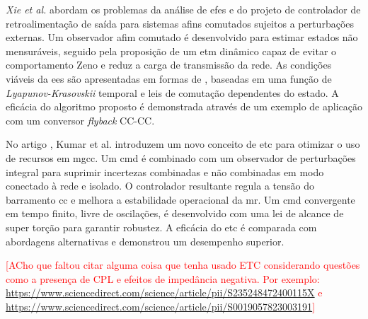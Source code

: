 \textit{Xie et al.} \cite{Xie2023} abordam os problemas da análise de \acrshort{efes} e do projeto de controlador de retroalimentação de saída para sistemas afins comutados sujeitos a perturbações externas. Um observador afim comutado é desenvolvido para estimar estados não mensuráveis, seguido pela proposição de um \acrshort{etm} dinâmico capaz de evitar o comportamento Zeno e reduz a carga de transmissão da rede. As condições viáveis da \acrshort{ees} são apresentadas em formas de , baseadas em uma função de \textit{Lyapunov-Krasovskii} temporal e leis de comutação dependentes do estado. A eficácia do algoritmo proposto é demonstrada através de um exemplo de aplicação com um conversor \textit{flyback} CC-CC.

No artigo \cite{Kumar2020}, Kumar et al. introduzem um novo conceito de \acrshort{etc} para otimizar o uso de recursos em \acrshort{mgcc}. Um \acrfull{cmd} é combinado com um observador de perturbações integral para suprimir incertezas combinadas e não combinadas em modo conectado à rede e isolado. O controlador resultante regula a tensão do barramento \acrshort{cc} e melhora a estabilidade operacional da \acrshort{mr}. Um \acrshort{cmd} convergente em tempo finito, livre de oscilações, é desenvolvido com uma lei de alcance de super torção para garantir robustez. A eficácia do \acrshort{etc} é comparada com abordagens alternativas e demonstrou um desempenho superior.

\textcolor{red}{[ACho que faltou citar alguma coisa que tenha usado ETC considerando questões como a presença de CPL e efeitos de impedância negativa. Por exemplo: \url{https://www.sciencedirect.com/science/article/pii/S235248472400115X} e \url{https://www.sciencedirect.com/science/article/pii/S0019057823003191}]}